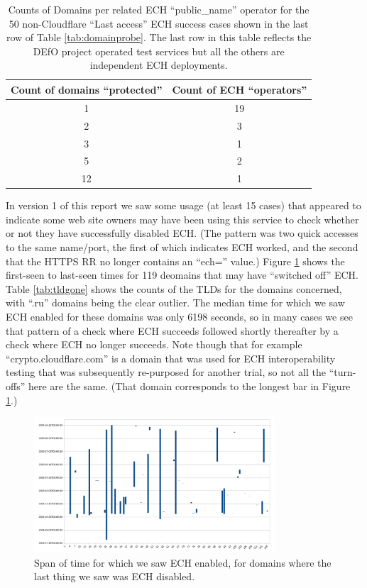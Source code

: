 \begin{table} 
	\centering
        \caption{Counts of Domains per related ECH ``public\_name'' operator for
                 the 50 non-Cloudflare ``Last access'' ECH success cases shown
                 in the last row of Table \ref{tab:domainprobe}. The last row
                 in this table reflects the DEfO project operated test services but
                 all the others are independent ECH deployments.}
		\begin{tabular} { | c | c | }
		\hline
            \hline Count of domains ``protected'' & Count of ECH ``operators'' \\
		\hline
            \hline 1 & 19 \\
            \hline 2 & 3 \\
            \hline 3 & 1 \\
            \hline 5 & 2 \\
            \hline 12 & 1 \\
		\hline
		\end{tabular}
	\label{tab:notcf}
\end{table}

In version 1 of this report we saw some usage (at least 15 cases) that
appeared to indicate some web site owners may have been using this service to check
whether or not they have successfully disabled ECH. (The pattern was two quick
accesses to the same name/port, the first of which indicates ECH worked, and
the second that the HTTPS RR no longer contains an ``ech='' value.)
Figure \ref{fig:onoff} shows the first-seen to last-seen times for 119
deomains that may have ``switched off'' ECH. Table \ref{tab:tldgone} shows the
counts of the TLDs for the domains concerned, with ``.ru'' domains being
the clear outlier. The median time for which we saw ECH enabled for these
domains was only 6198 seconds, so in many cases we see that pattern of a
check where ECH succeeds followed shortly thereafter by a check
where ECH no longer succeeds. Note though that for example ``crypto.cloudflare.com''
is a domain that was used for ECH interoperability testing that was subsequently 
re-purposed for another trial, so not all the ``turn-offs'' here are
the same. (That domain corresponds to the longest bar in Figure \ref{fig:onoff}.)

\begin{figure}
	\centering
	\includegraphics[width=0.8\textwidth,keepaspectratio]{turnofftimes.png}
        \caption[clustediag]{Span of time for which we saw ECH enabled, for
        domains where the last thing we saw was ECH disabled.}
	\label{fig:onoff}
\end{figure}


